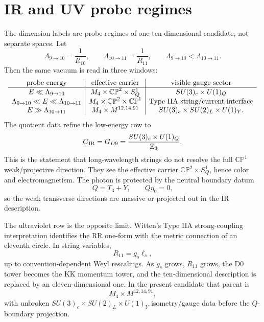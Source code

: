 \documentclass[11pt]{article}
\newcommand{\CP}{\mathbb{CP}}
\newcommand{\ZZ}{\mathbb{Z}}
\theoremstyle{plain}
\theoremstyle{definition}
\begin{document}
\section{IR and UV probe regimes}
\label{kk:sec:probe-regimes}

The dimension labels are probe regimes of one ten-dimensional candidate, not
separate spaces.  Let
\begin{equation}
  \Lambda_{9\to10}=\frac{1}{R_{10}},\qquad
  \Lambda_{10\to11}=\frac{1}{R_{11}},
  \qquad
  \Lambda_{9\to10}<\Lambda_{10\to11}.
  \label{kk:eq:thresholds}
\end{equation}
Then the same vacuum is read in three windows:
\begin{equation}
\begin{array}{c|c|c}
\hbox{probe energy} & \hbox{effective carrier} & \hbox{visible gauge sector}\\
\hline
E\ll\Lambda_{9\to10} &
M_4\times\CP^2\times S^1_Q &
SU(3)_c\times U(1)_Q\\
\Lambda_{9\to10}\ll E\ll\Lambda_{10\to11} &
M_4\times\CP^2\times\CP^1 &
\hbox{Type IIA string/current interface}\\
E\gg\Lambda_{10\to11} &
M_4\times M^{12,14,91} &
SU(3)_c\times SU(2)_L\times U(1)_Y .
\end{array}
\label{kk:eq:probe-regimes}
\end{equation}
The quotient data refine the low-energy row to
\begin{equation}
  G_{\rm IR}=G_{D9}=
  \frac{SU(3)_c\times U(1)_Q}{\ZZ_3}.
  \label{kk:eq:gir}
\end{equation}
This is the statement that long-wavelength strings do not resolve the full
\(\CP^1\) weak/projective direction.  They see the effective carrier
\(\CP^2\times S^1_Q\), hence color and electromagnetism.  The photon is protected
by the neutral boundary datum
\begin{equation}
  Q=T_3+Y,\qquad Q\eta_0=0,
  \label{kk:eq:qeta}
\end{equation}
so the weak transverse directions are massive or projected out in the IR
description.

The ultraviolet row is the opposite limit.  Witten's Type IIA strong-coupling
interpretation identifies the RR one-form with the metric connection of an
eleventh circle.  In string variables,
\begin{equation}
  R_{11}=g_s\ell_s,
  \label{kk:eq:r11}
\end{equation}
up to convention-dependent Weyl rescalings.  As \(g_s\) grows, \(R_{11}\)
grows, the D0 tower becomes the KK momentum tower, and the ten-dimensional
description is replaced by an eleven-dimensional one.  In the present candidate
that parent is
\begin{equation}
  M_4\times M^{12,14,91},
  \label{kk:eq:uvparent}
\end{equation}
with unbroken \(SU(3)_c\times SU(2)_L\times U(1)_Y\) isometry/gauge data before
the \(Q\)-boundary projection.
\end{document}
